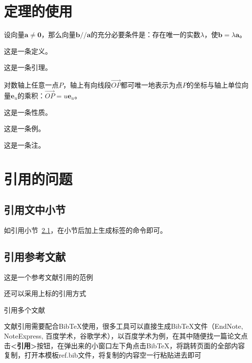 \section{定理的使用}
\begin{theorem}
  设向量$\boldsymbol a\neq\boldsymbol 0$，那么向量$\boldsymbol b//\boldsymbol a$的充分必要条件是：存在唯一的实数$\lambda$，使$\boldsymbol b=\lambda \boldsymbol a$。
\end{theorem}
\begin{definition}
  这是一条定义。
\end{definition}
\begin{lemma}
  这是一条引理。
\end{lemma}
\begin{corollary}
  对数轴上任意一点$P$，轴上有向线段$\vec {OP}$都可唯一地表示为点$P$的坐标与轴上单位向量$\boldsymbol e_u$的乘积：$\vec {OP}=u \boldsymbol e_u$。
\end{corollary}
\begin{proposition}
  这是一条性质。
\end{proposition}
\begin{example}
  这是一条例。
\end{example}
\begin{remark}
  这是一条注。
\end{remark}

\section{引用的问题}

\subsection{引用文中小节}\label{sec:ref}
如引用小节~\ref{sec:ref}，在小节后加上生成标签的命令即可。

\subsection{引用参考文献}
这是一个参考文献引用的范例\cite{r1}

还可以采用上标的引用方式

引用多个文献\cite{r1,r2,r3,r4,r5}

文献引用需要配合BibTeX使用，很多工具可以直接生成BibTeX文件（EndNote, NoteExpress, 百度学术，谷歌学术），以百度学术为例，在其中随便找一篇论文点击\textbf{<引用>}按钮，在弹出来的小窗口左下角点击BibTeX，将跳转页面的全部内容复制，打开本模板ref.bib文件，将复制的内容空一行粘贴进去即可

